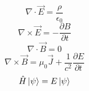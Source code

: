 \documentclass[9pt]{article}
\begin{document}
\begin{equation*}
    \nabla\cdot\vec{E}=\frac{\rho}{\epsilon _0}
\end{equation*}
\begin{equation*}
    \nabla\times\vec{E}=-\frac{\partial B}{\partial t}
\end{equation*}
\begin{equation*}
    \nabla\cdot\vec{B}=0
\end{equation*}
\begin{equation*}
    \nabla\times\vec{B}=\mu_0\vec{J}+\frac{1}{c^2}\frac{\partial E}{\partial t}
\end{equation*}
\begin{equation*}
    \hat{H}\ket{\psi}=E\ket{\psi}
\end{equation*}
\end{document}

